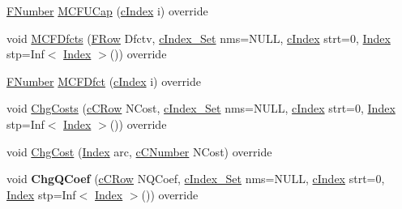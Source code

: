\begin{DoxyCompactItemize}
\item 
\mbox{\hyperlink{class_m_c_f_class_aeea3e5951d222b2a8e57de1b4246a909}{F\+Number}} \mbox{\hyperlink{class_m_c_f_cplex_a4d6ef4c8a12fee2699db2fd16b849991}{M\+C\+F\+U\+Cap}} (\mbox{\hyperlink{class_m_c_f_class_a76aaabb20535c51a2752b93f6c38fe54}{c\+Index}} i) override
\item 
void \mbox{\hyperlink{class_m_c_f_cplex_ad733f5fefcf64289d412534d229ff26f}{M\+C\+F\+Dfcts}} (\mbox{\hyperlink{class_m_c_f_class_a9dae1f1a39c208ce3c2b337cd5bb3d00}{F\+Row}} Dfctv, \mbox{\hyperlink{class_m_c_f_class_a81575b2d4e4d5636b17170432150ae69}{c\+Index\+\_\+\+Set}} nms=N\+U\+LL, \mbox{\hyperlink{class_m_c_f_class_a76aaabb20535c51a2752b93f6c38fe54}{c\+Index}} strt=0, \mbox{\hyperlink{class_m_c_f_class_ad53d6229d7ec28555a9c9c2fd9abf773}{Index}} stp=Inf$<$ \mbox{\hyperlink{class_m_c_f_class_ad53d6229d7ec28555a9c9c2fd9abf773}{Index}} $>$()) override
\item 
\mbox{\hyperlink{class_m_c_f_class_aeea3e5951d222b2a8e57de1b4246a909}{F\+Number}} \mbox{\hyperlink{class_m_c_f_cplex_ac6107cdac23180a7723ea0365d8f07a4}{M\+C\+F\+Dfct}} (\mbox{\hyperlink{class_m_c_f_class_a76aaabb20535c51a2752b93f6c38fe54}{c\+Index}} i) override
\item 
void \mbox{\hyperlink{class_m_c_f_cplex_a1f8f2db739c0307ee7f4383972821e12}{Chg\+Costs}} (\mbox{\hyperlink{class_m_c_f_class_ab700102e9ba8bb6015be6818d4e99097}{c\+C\+Row}} N\+Cost, \mbox{\hyperlink{class_m_c_f_class_a81575b2d4e4d5636b17170432150ae69}{c\+Index\+\_\+\+Set}} nms=N\+U\+LL, \mbox{\hyperlink{class_m_c_f_class_a76aaabb20535c51a2752b93f6c38fe54}{c\+Index}} strt=0, \mbox{\hyperlink{class_m_c_f_class_ad53d6229d7ec28555a9c9c2fd9abf773}{Index}} stp=Inf$<$ \mbox{\hyperlink{class_m_c_f_class_ad53d6229d7ec28555a9c9c2fd9abf773}{Index}} $>$()) override
\item 
void \mbox{\hyperlink{class_m_c_f_cplex_a5b694b932ddb1fc61d9f3d66aaca10e1}{Chg\+Cost}} (\mbox{\hyperlink{class_m_c_f_class_ad53d6229d7ec28555a9c9c2fd9abf773}{Index}} arc, \mbox{\hyperlink{class_m_c_f_class_a07dbefeeb08c3f63073622411893eb76}{c\+C\+Number}} N\+Cost) override
\item 
\mbox{\label{class_m_c_f_cplex_af86d8978a681b5cd2be9a9dc6b3e640e}} 
void {\bfseries Chg\+Q\+Coef} (\mbox{\hyperlink{class_m_c_f_class_ab700102e9ba8bb6015be6818d4e99097}{c\+C\+Row}} N\+Q\+Coef, \mbox{\hyperlink{class_m_c_f_class_a81575b2d4e4d5636b17170432150ae69}{c\+Index\+\_\+\+Set}} nms=N\+U\+LL, \mbox{\hyperlink{class_m_c_f_class_a76aaabb20535c51a2752b93f6c38fe54}{c\+Index}} strt=0, \mbox{\hyperlink{class_m_c_f_class_ad53d6229d7ec28555a9c9c2fd9abf773}{Index}} stp=Inf$<$ \mbox{\hyperlink{class_m_c_f_class_ad53d6229d7ec28555a9c9c2fd9abf773}{Index}} $>$()) override

\end{DoxyCompactItemize}

